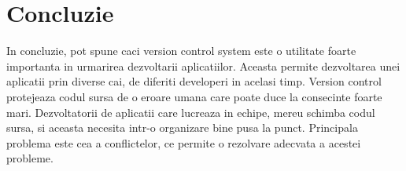\section*{Concluzie}


In concluzie, pot spune caci version control system este o utilitate foarte importanta in urmarirea dezvoltarii aplicatiilor. Aceasta permite dezvoltarea unei aplicatii prin diverse cai, de diferiti developeri in acelasi timp. Version control protejeaza codul sursa de o eroare umana care poate duce la consecinte foarte mari. Dezvoltatorii de aplicatii care lucreaza in echipe, mereu schimba codul sursa, si aceasta necesita intr-o organizare bine pusa la punct. Principala problema este cea a conflictelor, ce permite o rezolvare adecvata a acestei probleme.

\clearpage